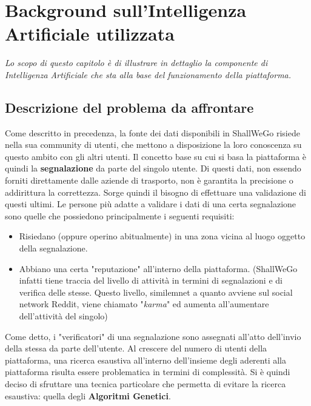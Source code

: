 \chapter{Background sull'Intelligenza Artificiale utilizzata} %
%

\begin{citazione}
    \textit{Lo scopo di questo capitolo è di illustrare in dettaglio la componente di Intelligenza Artificiale che sta alla base del funzionamento della piattaforma.}
\end{citazione}

\newpage

\section{Descrizione del problema da affrontare}
    Come descritto in precedenza, la fonte dei dati disponibili in ShallWeGo risiede nella sua community di utenti, che mettono a disposizione la loro conoscenza su questo ambito con gli altri utenti. Il concetto base su cui si basa la piattaforma è quindi la \textbf{segnalazione} da parte del singolo utente. Di questi dati, non essendo forniti direttamente dalle aziende di trasporto, non è garantita la precisione o addirittura la correttezza. Sorge quindi il bisogno di effettuare una validazione di questi ultimi. Le persone più adatte a validare i dati di una certa segnalazione sono quelle che possiedono principalmente i seguenti requisiti:
    \begin{itemize}
        \item Risiedano (oppure operino abitualmente) in una zona vicina al luogo oggetto della segnalazione.
        \item Abbiano una certa "reputazione" all'interno della piattaforma. (ShallWeGo infatti tiene traccia del livello di attività in termini di segnalazioni e di verifica delle stesse. Questo livello, similemnet a quanto avviene sul social network Reddit, viene chiamato "\textit{karma}" ed aumenta all'aumentare dell'attività del singolo)
    \end{itemize}

    Come detto, i "verificatori" di una segnalazione sono assegnati all'atto dell'invio della stessa da parte dell'utente. Al crescere del numero di utenti della piattaforma, una ricerca esaustiva all'interno dell'insieme degli aderenti alla piattaforma risulta essere problematica in termini di complessità. Si è quindi deciso di sfruttare una tecnica particolare che permetta di evitare la ricerca esaustiva: quella degli \textbf{Algoritmi Genetici}.

